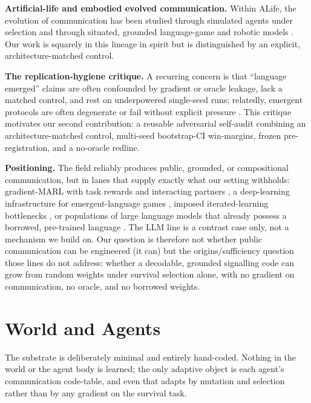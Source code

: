 \documentclass[12pt,letterpaper]{article}
\begin{document}
\textbf{Artificial-life and embodied evolved communication.} Within ALife, the evolution of
communication has been studied through simulated agents under selection
\citep{cangelosi2002} and through situated, grounded language-game and robotic models
\citep{steels2003,quinn2001,marocco2007}. Our work is squarely in this lineage in spirit
but is distinguished by an explicit, architecture-matched control.

\textbf{The replication-hygiene critique.} A recurring concern is that ``language emerged''
claims are often confounded by gradient or oracle leakage, lack a matched control, and rest
on underpowered single-seed runs; relatedly, emergent protocols are often degenerate or fail
without explicit pressure \citep{kottur2017,chaabouni2020}. This critique motivates our second
contribution: a reusable adversarial self-audit combining an architecture-matched control,
multi-seed bootstrap-CI win-margins, frozen pre-registration, and a no-oracle redline.

\textbf{Positioning.} The field reliably produces public, grounded, or compositional
communication, but in lanes that supply exactly what our setting withholds: gradient-MARL
with task rewards and interacting partners \citep{mordatch2018,lazaridoubaroni2020}, a
deep-learning infrastructure for emergent-language games \citep{kharitonov2019}, imposed
iterated-learning bottlenecks \citep{ren2020}, or populations of large language models that
already possess a borrowed, pre-trained language \citep{ashery2025}. The LLM line
is a contrast case only, not a mechanism we build on. Our question is therefore not whether
public communication can be engineered (it can) but the origins/sufficiency question
those lines do not address: whether a decodable, grounded signalling code can grow from
random weights under survival selection alone, with no gradient on communication, no
oracle, and no borrowed weights.

\section{World and Agents}

The substrate is deliberately minimal and entirely hand-coded. Nothing in the world or the
agent body is learned; the only adaptive object is each agent's communication code-table,
and even that adapts by mutation and selection rather than by any gradient on the survival
task.
\end{document}
